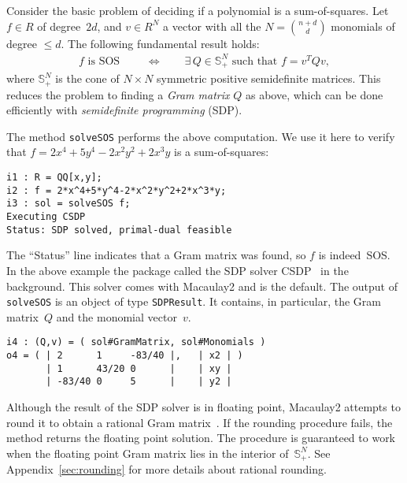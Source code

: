 \documentclass[11pt]{amsart}
\theoremstyle{plain}%
\theoremstyle{definition}
\theoremstyle{remark}
\newcommand{\Mac}{Macaulay2\xspace}
\begin{document}
Consider the basic problem of deciding if a polynomial is a sum-of-squares.
Let $f \!\in\! R$ of degree~$2d$,
and $v \!\in\! R^N$ a vector with all the $N \!=\! \binom{n+d}{d}$ monomials of degree $\leq\!d$.
The following fundamental result holds:
\begin{align*}
  f \text{ is SOS } 
  \qquad\iff\qquad
  \exists\, Q\in \mathbb{S}_+^N \text{ such that } f = v^T Q v,
\end{align*}
where $\mathbb{S}_+^N$ is the cone of $N{\times} N$ symmetric positive semidefinite matrices.
This reduces the problem to finding a \emph{Gram matrix} $Q$ as above, which can be done efficiently with \emph{semidefinite programming} (SDP).

The method \verb|solveSOS| performs the above computation.
We use it here to verify that $f = 2 x^4 {+} 5 y^4 {-} 2 x^2 y^2 {+} 2 x^3 y$ is a sum-of-squares:
{\small
\begin{verbatim}
i1 : R = QQ[x,y];
i2 : f = 2*x^4+5*y^4-2*x^2*y^2+2*x^3*y;
i3 : sol = solveSOS f;
Executing CSDP
Status: SDP solved, primal-dual feasible
\end{verbatim}
}
\noindent
The ``Status'' line indicates that a Gram matrix was found, so $f$ is indeed~SOS.
In the above example the package called the SDP solver CSDP~\cite{borchers1999csdp} in the background.
This solver comes with \Mac and is the default.
The output of \verb|solveSOS| is an object of type \verb|SDPResult|.
It contains, in particular, the Gram matrix~$Q$ and the monomial vector~$v$.
{\small
\begin{verbatim}
i4 : (Q,v) = ( sol#GramMatrix, sol#Monomials )
o4 = ( | 2      1     -83/40 |,   | x2 | )
       | 1      43/20 0      |    | xy | 
       | -83/40 0     5      |    | y2 | 
\end{verbatim}
}
\noindent
Although the result of the SDP solver is in floating point, Macaulay2 attempts to round it to obtain a rational Gram matrix~\cite{peyrl2008computing}.
{\color{blue}
If the rounding procedure fails, the method returns the floating point solution.
}
The procedure is guaranteed to work when the floating point Gram matrix lies in the interior of~$\mathbb{S}_+^N$.
{\color{blue}
See Appendix~\ref{sec:rounding} for more details about rational rounding.
}
\end{document}

